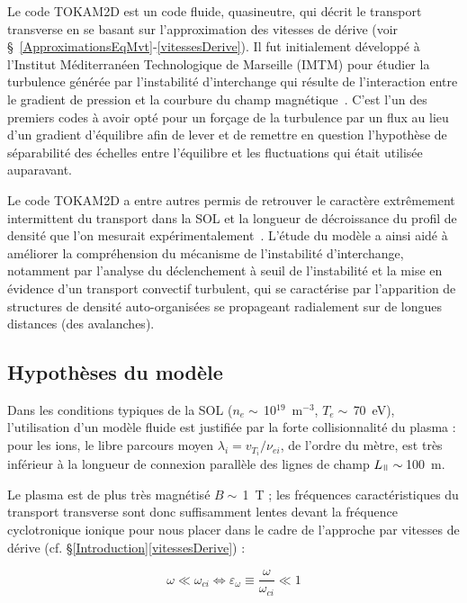 \begin{refsection}
Le code TOKAM2D est un code fluide, quasineutre, qui décrit le transport
transverse en se basant sur l'approximation des vitesses de dérive (voir
\S~\ref{ApproximationsEqMvt}-\ref{vitessesDerive}). Il fut initialement
développé à l'Institut Méditerranéen Technologique de Marseille (IMTM) pour
étudier la turbulence générée par l'instabilité d'interchange qui résulte de
l'interaction entre le gradient de pression et la courbure du champ
magnétique~\parencite{Garbet}. C'est l'un des premiers codes à avoir opté pour
un forçage de la turbulence par un flux au lieu d'un gradient d'équilibre afin
de lever et de remettre en question l'hypothèse de séparabilité des échelles
entre l'équilibre et les fluctuations qui était utilisée auparavant.

Le code TOKAM2D a entre autres permis de retrouver le caractère extrêmement
intermittent du transport dans la SOL et la longueur de décroissance du profil de densité que l'on
mesurait expérimentalement~\cite{SarazinPhD}. L'étude du modèle a ainsi aidé à
améliorer la compréhension du mécanisme de l'instabilité d'interchange,
notamment par l'analyse
du déclenchement à seuil de l'instabilité et la mise en évidence d'un transport
convectif turbulent, qui se caractérise par l'apparition de structures de
densité auto-organisées se propageant radialement sur de longues distances (des avalanches).

\subsection{Hypothèses du modèle}
\label{2-hypotheses}
Dans les conditions typiques de la SOL ($n_e\sim\,$10$^{19}$~m$^{-3}$,
$T_e\sim\,$70~eV), l'utilisation d'un modèle fluide est justifiée par la forte
collisionnalité du plasma : pour les ions, le libre parcours moyen
$\lambda_i=v_{{T}_{i}}/\nu_{ei}$, de l'ordre du mètre, est très
inférieur à la longueur de connexion parallèle des lignes de champ
$L_\para\sim\,$100~m.

Le plasma est de plus très magnétisé $B\sim\,$1~T ; les fréquences
caractéristiques du transport transverse sont donc suffisamment lentes devant la
fréquence cyclotronique ionique pour nous placer dans le cadre de
l'approche par vitesses de dérive (cf. \S\ref{Introduction}\ref{vitessesDerive})
:

\begin{equation}
\omega\ll\omega_{ci}\Leftrightarrow
\varepsilon_\omega\equiv\frac{\omega}{\omega_{ci}}\ll 1
\end{equation}


\end{refsection}
